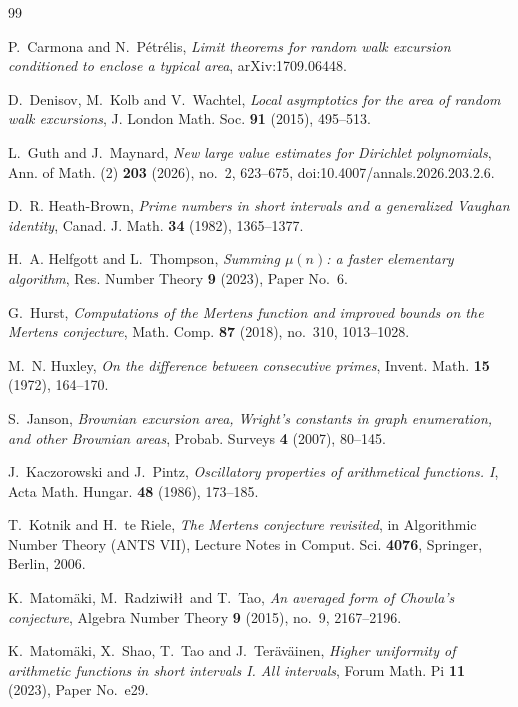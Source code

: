 \documentclass[11pt]{amsart}
\numberwithin{equation}{section}
\theoremstyle{plain}
\theoremstyle{definition}
\theoremstyle{remark}
\begin{document}
\begin{thebibliography}{99}

P.~Carmona and N.~P\'etr\'elis, \emph{Limit theorems for random walk excursion
conditioned to enclose a typical area}, arXiv:1709.06448.

D.~Denisov, M.~Kolb and V.~Wachtel, \emph{Local asymptotics for the area of
random walk excursions}, J. London Math. Soc. \textbf{91} (2015), 495--513.

L.~Guth and J.~Maynard, \emph{New large value estimates for Dirichlet
polynomials}, Ann. of Math. (2) \textbf{203} (2026), no.~2, 623--675,
doi:10.4007/annals.2026.203.2.6.

D.~R. Heath-Brown, \emph{Prime numbers in short intervals and a generalized
Vaughan identity}, Canad. J. Math. \textbf{34} (1982), 1365--1377.

H.~A. Helfgott and L.~Thompson, \emph{Summing $\mu(n)$: a faster elementary
algorithm}, Res. Number Theory \textbf{9} (2023), Paper No.~6.

G.~Hurst, \emph{Computations of the Mertens function and improved bounds on
the Mertens conjecture}, Math. Comp. \textbf{87} (2018), no.~310, 1013--1028.

M.~N. Huxley, \emph{On the difference between consecutive primes}, Invent.
Math. \textbf{15} (1972), 164--170.

S.~Janson, \emph{Brownian excursion area, Wright's constants in graph
enumeration, and other Brownian areas}, Probab. Surveys \textbf{4} (2007),
80--145.

J.~Kaczorowski and J.~Pintz, \emph{Oscillatory properties of arithmetical
functions. I}, Acta Math. Hungar. \textbf{48} (1986), 173--185.

T.~Kotnik and H.~te Riele, \emph{The Mertens conjecture revisited}, in
Algorithmic Number Theory (ANTS VII), Lecture Notes in Comput. Sci.
\textbf{4076}, Springer, Berlin, 2006.

K.~Matom\"aki, M.~Radziwi\l\l\ and T.~Tao, \emph{An averaged form of Chowla's
conjecture}, Algebra Number Theory \textbf{9} (2015), no.~9, 2167--2196.

K.~Matom\"aki, X.~Shao, T.~Tao and J.~Ter\"av\"ainen, \emph{Higher uniformity
of arithmetic functions in short intervals I. All intervals}, Forum Math.
Pi \textbf{11} (2023), Paper No.~e29.


\end{thebibliography}
\end{document}
